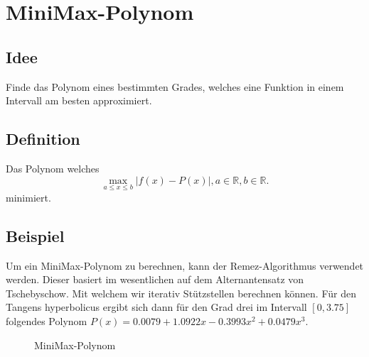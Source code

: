 %
%
%
\section{MiniMax-Polynom 
\label{transfer:section:teil3}}



\subsection{Idee
\label{transfer:subsection:idee}}
Finde das Polynom eines bestimmten Grades, welches eine Funktion in einem Intervall am besten approximiert.


\subsection{Definition
	\label{transfer:subsection:definition}}
Das Polynom welches 
	    $$ \max _{a \leq x \leq b}|f(x)-P(x)| , a \in \mathbb{R}, b \in \mathbb{R}.$$
minimiert.
\subsection{Beispiel
	\label{transfer:subsection:beispiel}}
Um ein MiniMax-Polynom zu berechnen, kann der Remez-Algorithmus verwendet werden. Dieser basiert im wesentlichen auf dem Alternantensatz von Tschebyschow. Mit welchem wir iterativ Stützstellen berechnen können. Für den Tangens hyperbolicus ergibt sich dann für den Grad drei im Intervall $[0,3.75]$ folgendes Polynom $P(x)=0.0079+1.0922 x-0.3993 x^{2}+0.0479 x^{3}$.


\begin{figure}
	\centering
	\caption{MiniMax-Polynom
		\label{motivation:figure:Minimax3}}
\end{figure}



